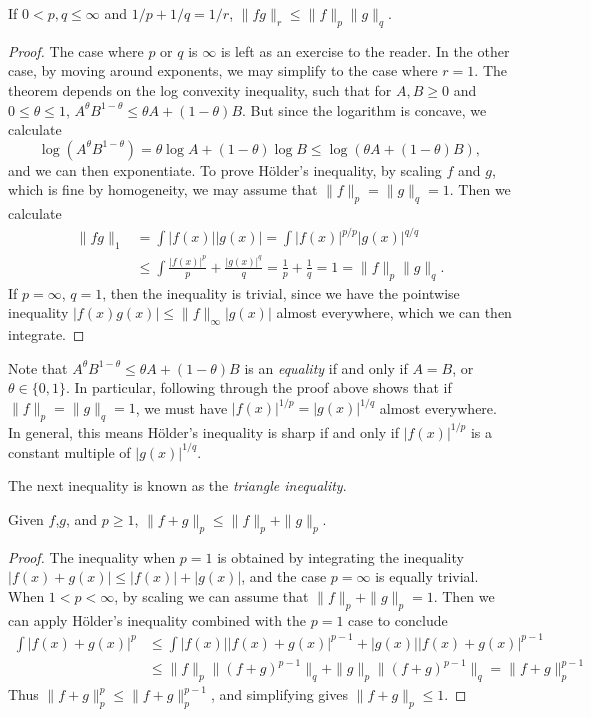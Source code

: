 \begin{theorem}[H\"{o}lder]
  If $0 < p,q \leq \infty$ and $1/p + 1/q = 1/r$, $\| f g \|_r \leq \| f \|_p \| g \|_q$.
\end{theorem}
\begin{proof}
  The case where $p$ or $q$ is $\infty$ is left as an exercise to the reader. In the other case, by moving around exponents, we may simplify to the case where $r = 1$. The theorem depends on the log convexity inequality, such that for $A,B \geq 0$ and $0 \leq \theta \leq 1$, $A^\theta B^{1 - \theta} \leq \theta A + (1 - \theta) B$. But since the logarithm is concave, we calculate
  \[ \log(A^\theta B^{1 - \theta}) = \theta \log A + (1 - \theta) \log B \leq \log(\theta A + (1 - \theta) B), \]
  and we can then exponentiate. To prove H\"{o}lder's inequality, by scaling $f$ and $g$, which is fine by homogeneity, we may assume that $\| f \|_p = \| g \|_q = 1$. Then we calculate
  \begin{align*}
    \| f g \|_1 &= \int |f(x)| |g(x)| = \int |f(x)|^{p/p} |g(x)|^{q/q}\\
    &\leq \int \frac{|f(x)|^p}{p} + \frac{|g(x)|^q}{q} = \frac{1}{p} + \frac{1}{q} = 1 = \| f \|_p \| g \|_q.
  \end{align*}
  If $p = \infty$, $q = 1$, then the inequality is trivial, since we have the pointwise inequality $|f(x) g(x)| \leq \| f \|_\infty |g(x)|$ almost everywhere, which we can then integrate.
\end{proof}

\begin{remark}
  Note that $A^\theta B^{1-\theta} \leq \theta A + (1 - \theta) B$ is an \emph{equality} if and only if $A = B$, or $\theta \in \{ 0, 1 \}$. In particular, following through the proof above shows that if $\| f \|_p = \| g \|_q = 1$, we must have $|f(x)|^{1/p} = |g(x)|^{1/q}$ almost everywhere. In general, this means H\"{o}lder's inequality is sharp if and only if $|f(x)|^{1/p}$ is a constant multiple of $|g(x)|^{1/q}$.
\end{remark}

The next inequality is known as the \emph{triangle inequality}.

\begin{corollary} \label{lptriangleinequality}
  Given $f$,$g$, and $p \geq 1$, $\| f + g \|_p \leq \| f \|_p + \| g \|_p$.
\end{corollary}
\begin{proof}
  The inequality when $p = 1$ is obtained by integrating the inequality $|f(x) + g(x)| \leq |f(x)| + |g(x)|$, and the case $p = \infty$ is equally trivial. When $1 < p < \infty$, by scaling we can assume that $\| f \|_p + \| g \|_p = 1$. Then we can apply H\"{o}lder's inequality combined with the $p = 1$ case to conclude
  \begin{align*}
    \int |f(x) + g(x)|^p &\leq \int |f(x)| |f(x) + g(x)|^{p-1} + |g(x)| |f(x) + g(x)|^{p-1}\\
    &\leq \| f \|_p \| (f + g)^{p-1} \|_q + \| g \|_p \| (f + g)^{p-1} \|_q = \| f + g \|_{p}^{p-1}
  \end{align*}
  Thus $\| f + g \|_p^p \leq \| f + g \|_p^{p-1}$, and simplifying gives $\| f + g \|_p \leq 1$.
\end{proof}


